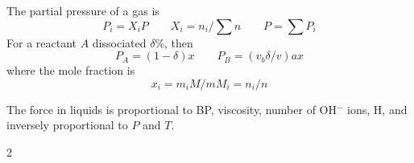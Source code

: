 \documentclass[10pt]{extarticle}
\begin{document}
\begin{multicols*}{2}
\bigskip
The partial pressure of a gas is
\begin{equation}
  P_i = X_i P \qquad X_i = n_i / \textstyle\sum n \qquad P = \textstyle\sum P_i
\end{equation}
For a reactant $A$ dissociated $\delta \%$, then \begin{equation}
  P_A = (1-\delta)x \qquad P_B = (v_b \delta / v)a x
\end{equation}
where the mole fraction is
\begin{equation}
  x_i = m_i M / m M_i = n_i / n
\end{equation}

The force in liquids is proportional to BP, viscosity, number of OH$^-$ ions, H, and inversely proportional to $P$ and $T$.

\end{multicols*}{2}
\end{document}
